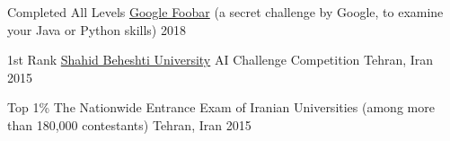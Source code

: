 \begin{cvhonors}

  \cvhonor
    {Completed All Levels} %
    {\href{https://google.com/foobar}{Google Foobar} (a secret challenge by Google, to examine your Java or Python skills)} %
    {} %
    {2018} %

  \cvhonor
    {1st Rank} %
    {\href{http://en.sbu.ac.ir/}{Shahid Beheshti University} AI Challenge Competition} %
    {Tehran, Iran} %
    {2015} %

  \cvhonor
    {Top 1\%} %
    {The Nationwide Entrance Exam of Iranian Universities (among more than 180,000 contestants)} %
    {Tehran, Iran} %
    {2015} %


\end{cvhonors}
